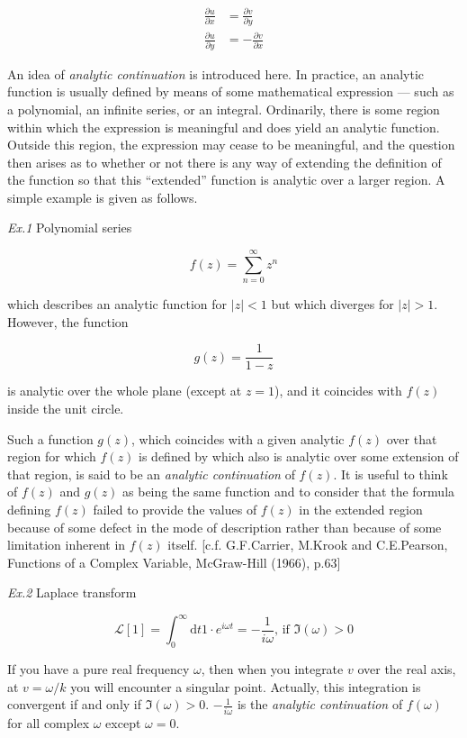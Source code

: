 \documentclass[
  notoc %
]{tufte-book}
\begin{document}
\[
\begin{aligned}
\frac{\partial u}{\partial x}&=\frac{\partial v}{\partial y} \\
\frac{\partial u}{\partial y}&=-\frac{\partial v}{\partial x}
\end{aligned}
\]

An idea of \emph{analytic continuation} is introduced here. In practice,
an analytic function is usually defined by means of some mathematical
expression --- such as a polynomial, an infinite series, or an integral.
Ordinarily, there is some region within which the expression is
meaningful and does yield an analytic function. Outside this region, the
expression may cease to be meaningful, and the question then arises as
to whether or not there is any way of extending the definition of the
function so that this ``extended'' function is analytic over a larger
region. A simple example is given as follows.

\emph{Ex.1} Polynomial series

\[
f(z)=\sum_{n=0}^{\infty} z^n
\]

which describes an analytic function for \(|z|<1\) but which diverges
for \(|z|>1\). However, the function

\[
g(z)=\frac{1}{1-z}
\]

is analytic over the whole plane (except at \(z=1\)), and it coincides
with \(f(z)\) inside the unit circle.

Such a function \(g(z)\), which coincides with a given analytic \(f(z)\)
over that region for which \(f(z)\) is defined by which also is analytic
over some extension of that region, is said to be an \emph{analytic
continuation} of \(f(z)\). It is useful to think of \(f(z)\) and
\(g(z)\) as being the same function and to consider that the formula
defining \(f(z)\) failed to provide the values of \(f(z)\) in the
extended region because of some defect in the mode of description rather
than because of some limitation inherent in \(f(z)\) itself. {[}c.f.
G.F.Carrier, M.Krook and C.E.Pearson, Functions of a Complex Variable,
McGraw-Hill (1966), p.63{]}

\emph{Ex.2} Laplace transform

\[
\mathcal{L}[1]= \int_0^\infty \mathrm{d}t 1\cdot e^{i\omega t}=-\frac{1}{i\omega},\, \textrm{if } \Im(\omega)>0
\]

If you have a pure real frequency \(\omega\), then when you integrate
\(v\) over the real axis, at \(v=\omega/k\) you will encounter a
singular point. Actually, this integration is convergent if and only if
\(\Im(\omega)>0\). \(-\frac{1}{i\omega}\) is the \emph{analytic
continuation} of \(f(\omega)\) for all complex \(\omega\) except
\(\omega=0\).
\end{document}

